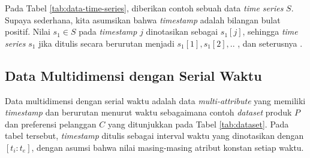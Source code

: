 Pada Tabel \ref{tab:data-time-series}, diberikan contoh sebuah data \textit{time series} $S$. Supaya sederhana, kita asumsikan bahwa \textit{timestamp} adalah bilangan bulat positif. Nilai $s_1 \in S$ pada \textit{timestamp} $j$ dinotasikan sebagai $s_1[j]$, sehingga \textit{time series} $s_1$ jika ditulis secara berurutan menjadi $s_1[1], s_1[2],..$ , dan seterusnya \cite{time-series}.

\subsection{Data Multidimensi dengan Serial Waktu}
\tab Data multidimensi dengan serial waktu adalah data \textit{multi-attribute} yang memiliki \textit{timestamp} dan berurutan menurut waktu sebagaimana contoh \textit{dataset} produk $P$ dan preferensi pelanggan $C$ yang ditunjukkan pada Tabel \ref{tab:dataset}. Pada tabel tersebut, \textit{timestamp} ditulis sebagai interval waktu yang dinotasikan dengan $[t_i:t_e]$, dengan asumsi bahwa nilai masing-masing atribut konstan setiap waktu. 

